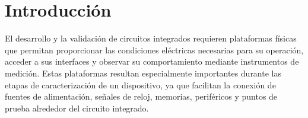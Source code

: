 \documentclass[journal,trans]{IEEEtran}
\begin{document}

\section{Introducción}
El desarrollo y la validación de circuitos integrados requieren plataformas físicas que permitan proporcionar las condiciones eléctricas necesarias para su operación, acceder a sus interfaces y observar su comportamiento mediante instrumentos de medición. Estas plataformas resultan especialmente importantes durante las etapas de caracterización de un dispositivo, ya que facilitan la conexión de fuentes de alimentación, señales de reloj, memorias, periféricos y puntos de prueba alrededor del circuito integrado.\\
\end{document}
